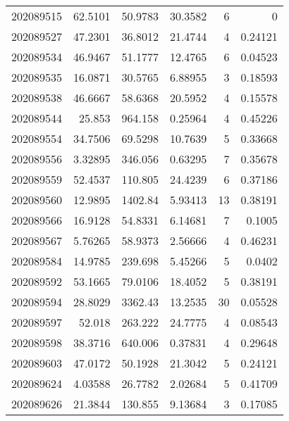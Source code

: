 \begin{tabular}{rrrrrr}
 202089515 &         62.5101  &       50.9783 &           30.3582  &           6 & 0       \\
 202089527 &         47.2301  &       36.8012 &           21.4744  &           4 & 0.24121 \\
 202089534 &         46.9467  &       51.1777 &           12.4765  &           6 & 0.04523 \\
 202089535 &         16.0871  &       30.5765 &            6.88955 &           3 & 0.18593 \\
 202089538 &         46.6667  &       58.6368 &           20.5952  &           4 & 0.15578 \\
 202089544 &         25.853   &      964.158  &            0.25964 &           4 & 0.45226 \\
 202089554 &         34.7506  &       69.5298 &           10.7639  &           5 & 0.33668 \\
 202089556 &          3.32895 &      346.056  &            0.63295 &           7 & 0.35678 \\
 202089559 &         52.4537  &      110.805  &           24.4239  &           6 & 0.37186 \\
 202089560 &         12.9895  &     1402.84   &            5.93413 &          13 & 0.38191 \\
 202089566 &         16.9128  &       54.8331 &            6.14681 &           7 & 0.1005  \\
 202089567 &          5.76265 &       58.9373 &            2.56666 &           4 & 0.46231 \\
 202089584 &         14.9785  &      239.698  &            5.45266 &           5 & 0.0402  \\
 202089592 &         53.1665  &       79.0106 &           18.4052  &           5 & 0.38191 \\
 202089594 &         28.8029  &     3362.43   &           13.2535  &          30 & 0.05528 \\
 202089597 &         52.018   &      263.222  &           24.7775  &           4 & 0.08543 \\
 202089598 &         38.3716  &      640.006  &            0.37831 &           4 & 0.29648 \\
 202089603 &         47.0172  &       50.1928 &           21.3042  &           5 & 0.24121 \\
 202089624 &          4.03588 &       26.7782 &            2.02684 &           5 & 0.41709 \\
 202089626 &         21.3844  &      130.855  &            9.13684 &           3 & 0.17085 \\

\end{tabular}
